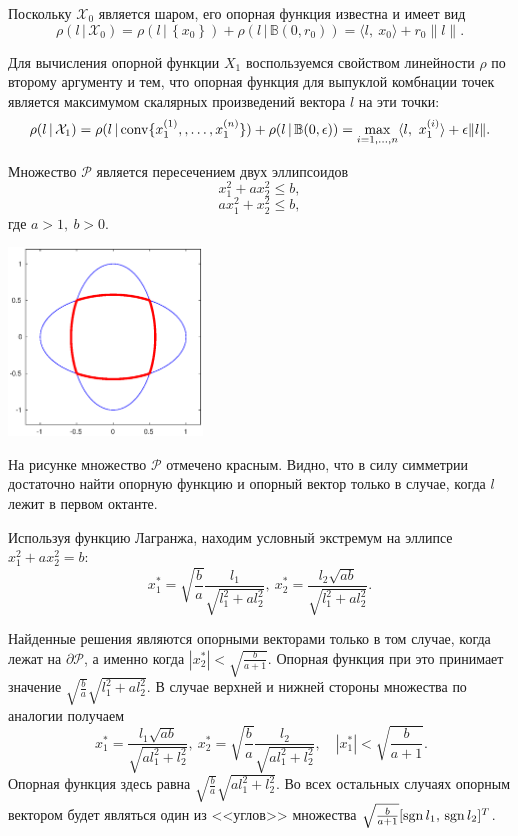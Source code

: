 \documentclass[11pt]{article}
\newcommand\PS{\mathcal{P}}
\newcommand\X{\mathcal{X}}
\newcommand\Sup[2]{\rho( #1 \, | \, #2 )}
\newcommand\Conv[1]{{\rm conv}\{ #1 \}}
\newcommand\Sgn{{\rm sgn \,}}
\begin{document}
Поскольку $\X_0$ является шаром, его опорная функция известна и имеет вид
$$\Sup{l}{\X_0} = \Sup{l}{\left\{x_0\right\}} + \Sup{l}{\mathbb{B}(0, r_0)} = 
\langle l, \ x_0 \rangle + r_0\|l\|.$$

Для вычисления опорной функции $X_1$ воспользуемся свойством линейности $\rho$ по второму аргументу и 
тем, что опорная функция для выпуклой комбнации точек является максимумом скалярных произведений
вектора $l$ на эти точки:
$$\Sup{l}{\X_1} = \Sup{l}{\Conv{x_1^{\left(1\right)},, \ldots, x_1^{\left(n\right)}}} + \Sup{l}{\mathbb{B}(0, \epsilon)} =
\max_{i = 1,\ldots,n} \langle l, \ x_1^{\left(i\right)} \rangle + \epsilon \|l\|.$$

Множество $\PS$ является пересечением двух эллипсоидов \\
$$x_1^2 + a x_2^2 \leq b,$$
$$ax_1^2 + x_2^2 \leq b,$$
где $a > 1, \ b > 0$. \\
\noindent
\parbox[b][5cm][t]{50mm}{\includegraphics[height=50mm]{P_set.eps}}
\hfill
\parbox[b][5cm][t]{90mm}{
На рисунке множество $\PS$ отмечено красным. Видно, что в силу симметрии достаточно найти опорную
функцию и опорный вектор только в случае, когда $l$ лежит в первом октанте.

Используя функцию Лагранжа, находим условный экстремум на эллипсе $x_1^2 + a x_2^2 = b$:
$$x_1^* = \sqrt{\frac{b}{a}}\frac{l_1}{\sqrt{l_1^2+al_2^2}}, \ x_2^* = \frac{l_2\sqrt{ab}}{\sqrt{l_1^2+al_2^2}}.$$
}
Найденные решения являются опорными векторами только в том случае, когда лежат на $\partial \PS$, 
а именно когда $|x_2^*| < \sqrt{\frac{b}{a+1}}$. Опорная функция при это принимает значение 
$\sqrt{\frac{b}{a}}\sqrt{l_1^2+al_2^2}$. В случае верхней и нижней стороны множества по аналогии получаем
$$\ x_1^* = \frac{l_1\sqrt{ab}}{\sqrt{al_1^2+l_2^2}},\  x_2^* = \sqrt{\frac{b}{a}}\frac{l_2}{\sqrt{al_1^2+l_2^2}}, \quad |x_1^*| < \sqrt{\frac{b}{a+1}}.$$
Опорная функция здесь равна $\sqrt{\frac{b}{a}}\sqrt{al_1^2+l_2^2}$. Во всех остальных случаях опорным 
вектором будет являться один из <<углов>> множества $\sqrt{\frac{b}{a+1}}[\Sgn{l_1}, \, \Sgn{l_2}]^T$.
\end{document}
